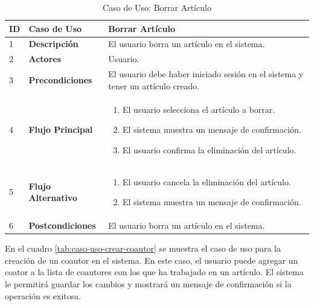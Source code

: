 \begin{table}[H]
    \centering
        \begin{tabular}{|p{0.5cm}|p{3.5cm}|p{10cm}|}
        \hline
        \textbf{ID} & \textbf{Caso de Uso} & \textbf{Borrar Artículo} \\
        \hline
        1 & \textbf{Descripción} & El usuario borra un artículo en el sistema. \\
        \hline
        2 & \textbf{Actores} & Usuario. \\
        \hline
        3 & \textbf{Precondiciones} & El usuario debe haber iniciado sesión en el sistema y tener un artículo creado. \\
        \hline
        4 & \textbf{Flujo Principal} & 
        \begin{enumerate}
            \item El usuario selecciona el artículo a borrar.
            \item El sistema muestra un mensaje de confirmación.
            \item El usuario confirma la eliminación del artículo.
        \end{enumerate} \\
        \hline
        5 & \textbf{Flujo Alternativo} & 
        \begin{enumerate}
            \item El usuario cancela la eliminación del artículo.
            \item El sistema muestra un mensaje de confirmación.
        \end{enumerate} \\
        \hline
        6 & \textbf{Postcondiciones} & El usuario borra un artículo en el sistema. \\
        \hline
    \end{tabular}
    \caption{Caso de Uso: Borrar Artículo}
    \label{tab:caso-uso-borrar-articulo}
\end{table}

En el cuadro \ref{tab:caso-uso-crear-coautor} se muestra el caso de uso para la creación de un coautor en el sistema. En este caso, el usuario puede agregar un coator a la lista de coautores con los que ha trabajado en un artículo. El sistema le permitirá guardar los cambios y mostrará un mensaje de confirmación si la operación es exitosa.

